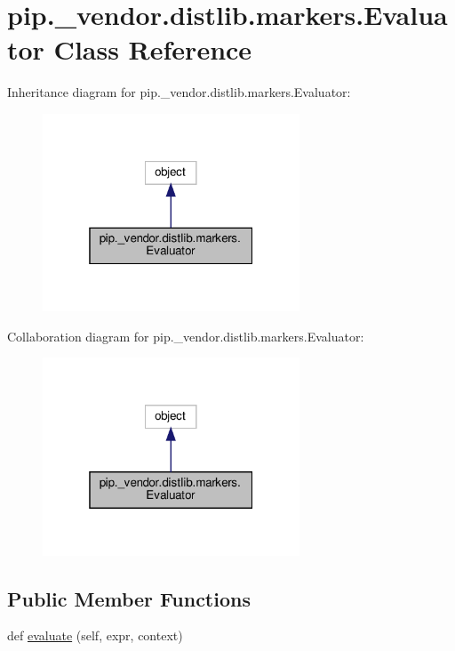 \hypertarget{classpip_1_1__vendor_1_1distlib_1_1markers_1_1Evaluator}{}\section{pip.\+\_\+vendor.\+distlib.\+markers.\+Evaluator Class Reference}
\label{classpip_1_1__vendor_1_1distlib_1_1markers_1_1Evaluator}


Inheritance diagram for pip.\+\_\+vendor.\+distlib.\+markers.\+Evaluator\+:
\nopagebreak
\begin{figure}[H]
\begin{center}
\leavevmode
\includegraphics[width=217pt]{classpip_1_1__vendor_1_1distlib_1_1markers_1_1Evaluator__inherit__graph}
\end{center}
\end{figure}


Collaboration diagram for pip.\+\_\+vendor.\+distlib.\+markers.\+Evaluator\+:
\nopagebreak
\begin{figure}[H]
\begin{center}
\leavevmode
\includegraphics[width=217pt]{classpip_1_1__vendor_1_1distlib_1_1markers_1_1Evaluator__coll__graph}
\end{center}
\end{figure}
\subsection*{Public Member Functions}
\begin{DoxyCompactItemize}
\item 
def \hyperlink{classpip_1_1__vendor_1_1distlib_1_1markers_1_1Evaluator_aa4ac9be35d86c0601dfab712e2e47d5a}{evaluate} (self, expr, context)
\end{DoxyCompactItemize}
